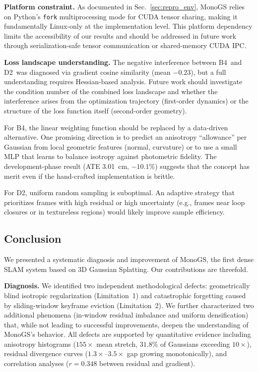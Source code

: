\documentclass[conference]{IEEEtran}
\begin{document}
\textbf{Platform constraint.}
As documented in Sec.~\ref{sec:repro_env}, MonoGS relies on Python's \texttt{fork} multiprocessing mode for CUDA tensor sharing, making it fundamentally Linux-only at the implementation level.
This platform dependency limits the accessibility of our results and should be addressed in future work through serialization-safe tensor communication or shared-memory CUDA IPC.

\textbf{Loss landscape understanding.}
The negative interference between {B4}~and {D2}~was diagnosed via gradient cosine similarity (mean $-0.23$), but a full understanding requires Hessian-based analysis.
Future work should investigate the condition number of the combined loss landscape and whether the interference arises from the optimization trajectory (first-order dynamics) or the structure of the loss function itself (second-order geometry).

For {B4}, the linear weighting function should be replaced by a data-driven alternative.
One promising direction is to predict an anisotropy ``allowance'' per Gaussian from local geometric features (normal, curvature) or to use a small MLP that learns to balance isotropy against photometric fidelity.
The development-phase result (ATE 3.01~cm, $-10.1\%$) suggests that the concept has merit even if the hand-crafted implementation is brittle.

For {D2}, uniform random sampling is suboptimal.
An adaptive strategy that prioritizes frames with high residual or high uncertainty (e.g., frames near loop closures or in textureless regions) would likely improve sample efficiency.

\subsection{Conclusion}
\label{sec:conclusion}

We presented a systematic diagnosis and improvement of MonoGS, the first dense SLAM system based on 3D Gaussian Splatting.
Our contributions are threefold.

\textbf{Diagnosis.}
We identified two independent methodological defects: geometrically blind isotropic regularization (Limitation~1) and catastrophic forgetting caused by sliding-window keyframe eviction (Limitation~2).
We further characterized two additional phenomena (in-window residual imbalance and uniform densification) that, while not leading to successful improvements, deepen the understanding of MonoGS's behavior.
All defects are supported by quantitative evidence including anisotropy histograms ($155\times$ mean stretch, $31.8\%$ of Gaussians exceeding $10\times$), residual divergence curves ($1.3\times$--$3.5\times$ gap growing monotonically), and correlation analyses ($r=0.348$ between residual and gradient).
\end{document}
